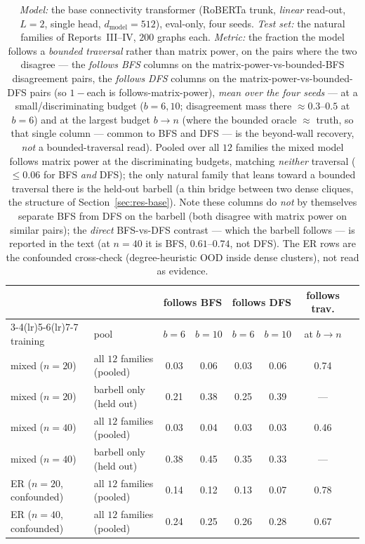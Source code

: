 \documentclass[11pt,a4paper]{article}
\begin{document}
\begin{table}[H]\centering\small\setlength{\tabcolsep}{5pt}
\begin{tabular}{llcccccc}
\toprule
 & & \multicolumn{2}{c}{follows BFS} & \multicolumn{2}{c}{follows DFS} & follows trav. \\
\cmidrule(lr){3-4}\cmidrule(lr){5-6}\cmidrule(lr){7-7}
training & pool & $b{=}6$ & $b{=}10$ & $b{=}6$ & $b{=}10$ & at $b{\to}n$ \\
\midrule
mixed ($n{=}20$) & all $12$ families (pooled) & 0.03 & 0.06 & 0.03 & 0.06 & 0.74 \\
mixed ($n{=}20$) & barbell only (held out)    & 0.21 & 0.38 & 0.25 & 0.39 & --- \\
mixed ($n{=}40$) & all $12$ families (pooled) & 0.03 & 0.04 & 0.03 & 0.03 & 0.46 \\
mixed ($n{=}40$) & barbell only (held out)    & 0.38 & 0.45 & 0.35 & 0.33 & --- \\
\midrule
ER ($n{=}20$, confounded) & all $12$ families (pooled) & 0.14 & 0.12 & 0.13 & 0.07 & 0.78 \\
ER ($n{=}40$, confounded) & all $12$ families (pooled) & 0.24 & 0.25 & 0.26 & 0.28 & 0.67 \\
\bottomrule
\end{tabular}
\caption{\emph{Model:} the base connectivity transformer (RoBERTa trunk, \emph{linear} read-out,
$L=2$, single head, $d_{\mathrm{model}}=512$), eval-only, four seeds. \emph{Test set:} the natural
families of Reports~III--IV, $200$ graphs each. \emph{Metric:} the fraction the model follows a
\emph{bounded traversal} rather than matrix power, on the pairs where the two disagree --- the
\emph{follows BFS} columns on the matrix-power-vs-bounded-BFS disagreement pairs, the \emph{follows
DFS} columns on the matrix-power-vs-bounded-DFS pairs (so $1-{}$each is follows-matrix-power),
\emph{mean over the four seeds} --- at a small/discriminating budget ($b=6,10$; disagreement mass
there $\approx0.3$--$0.5$ at $b{=}6$) and at the largest budget $b{\to}n$ (where the bounded oracle
$\approx$ truth, so that single column --- common to BFS and DFS --- is the beyond-wall recovery,
\emph{not} a bounded-traversal read). Pooled over all $12$ families the mixed model follows matrix
power at the discriminating budgets, matching \emph{neither} traversal ($\le0.06$ for BFS \emph{and}
DFS); the only natural family that leans toward a bounded traversal there is the held-out barbell (a
thin bridge between two dense cliques, the structure of Section~\ref{sec:res-base}). Note these
columns do \emph{not} by themselves separate BFS from DFS on the barbell (both disagree with matrix
power on similar pairs); the \emph{direct} BFS-vs-DFS contrast --- which the barbell follows --- is
reported in the text (at $n=40$ it is BFS, $0.61$--$0.74$, not DFS). The ER rows are the confounded
cross-check (degree-heuristic OOD inside dense clusters), not read as evidence.}
\label{tab:capstone}
\end{table}
\end{document}
